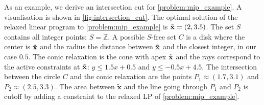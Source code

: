 As an example, we derive an intersection cut for \cref{problem:mip_example}. A visualisation is shown in \cref{fig:intersection_cut}. 
The optimal solution of the relaxed linear program to \cref{problem:mip_example} is $\bold{\tilde x} = (2, 3.5)$. The set $S$ contains all integer points: $S = \mathbb{Z}$. A possible $S$-free set $C$ is a disk where the center is $\bold{\tilde x}$ and the radius the distance between $\bold{\tilde x}$ and the closest integer, in our case $0.5$. 
The conic relaxation is the cone with apex $\bold{\tilde x}$ and the rays correspond to the active constraints at $\bold{\tilde x}$: $y \leq 1.5x + 0.5$ and $y \leq -0.5 x + 4.5$. 
The intersection between the circle $C$ and the conic relaxation are the points $P_1 \approx (1.7,3.1)$ and $P_2 \approx (2.5,3.3)$. The area between $\boldsymbol{\tilde x}$ and the line going through $P_1$ and $P_2$ is cutoff by adding a constraint to the relaxed LP of \cref{problem:mip_example}. 

